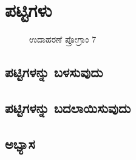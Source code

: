 \chapter{ಪಟ್ಟಿಗಳು}
\begin{figure}[h]
\begin{Scratch}[1]
\beginbox{}
\end{Scratch}
\caption{ಉದಾಹರಣೆ ಪ್ರೋಗ್ರಾಂ 7}
\end{figure}

\section{ಪಟ್ಟಿಗಳನ್ನು ಬಳಸುವುದು}

\section{ಪಟ್ಟಿಗಳನ್ನು ಬದಲಾಯಿಸುವುದು} 

\section{ಅಭ್ಯಾಸ }
